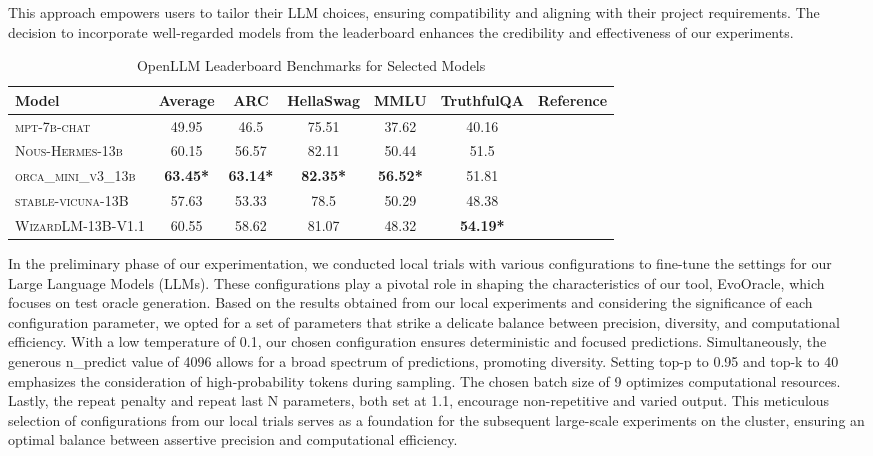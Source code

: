 This approach empowers users to tailor their LLM choices, ensuring compatibility and aligning with their project requirements. The decision to incorporate well-regarded models from the leaderboard enhances the credibility and effectiveness of our experiments.

\begin{table}[htbp]
    \centering    
    \begin{tabular}{l | c | c | c | c | c | r}
        \textbf{Model} & \textbf{Average} & \textbf{ARC} & \textbf{HellaSwag} & \textbf{MMLU} & \textbf{TruthfulQA} & \textbf{Reference} \\
        \hline
        \scriptsize\textsc{mpt-7b-chat} & 49.95 & 46.5 & 75.51 & 37.62 & 40.16 & \cite{MosaicML2023Introducing}\cite{noauthor_mosaicmlmpt-7b-chat_2023}  \\
        \scriptsize\textsc{Nous-Hermes-13b} & 60.15 & 56.57 & 82.11 & 50.44 & 51.5 & \cite{noauthor_nousresearchnous-hermes-13b_nodate} \\
        \scriptsize\textsc{orca\_mini\_v3\_13b}  & \textbf{63.45*} & \textbf{63.14*} & \textbf{82.35*} & \textbf{56.52*} & 51.81 & \cite{noauthor_pankajmathurorca_mini_v3_13b_2023}\cite{mukherjee2023orca}\\
        \scriptsize\textsc{stable-vicuna-13B}  & 57.63 & 53.33 & 78.5 & 50.29 & 48.38 & \cite{noauthor_theblokestable-vicuna-13b-hf_2023} \\
        \scriptsize\textsc{WizardLM-13B-V1.1}  & 60.55 & 58.62 & 81.07 & 48.32 & \textbf{54.19*} & \cite{noauthor_theblokewizardlm-13b-v1-1-superhot-8k-fp16_nodate}\cite{vicuna2023} \\
    \end{tabular}
\caption{OpenLLM Leaderboard Benchmarks for Selected Models}
\label{tab:selected_models}
\end{table}

In the preliminary phase of our experimentation, we conducted local trials with various configurations to fine-tune the settings for our Large Language Models (LLMs). These configurations play a pivotal role in shaping the characteristics of our tool, EvoOracle, which focuses on test oracle generation. Based on the results obtained from our local experiments and considering the significance of each configuration parameter, we opted for a set of parameters that strike a delicate balance between precision, diversity, and computational efficiency. With a low temperature of 0.1, our chosen configuration ensures deterministic and focused predictions. Simultaneously, the generous n\_predict value of 4096 allows for a broad spectrum of predictions, promoting diversity. Setting top-p to 0.95 and top-k to 40 emphasizes the consideration of high-probability tokens during sampling. The chosen batch size of 9 optimizes computational resources. Lastly, the repeat penalty and repeat last N parameters, both set at 1.1, encourage non-repetitive and varied output. This meticulous selection of configurations from our local trials serves as a foundation for the subsequent large-scale experiments on the cluster, ensuring an optimal balance between assertive precision and computational efficiency.

